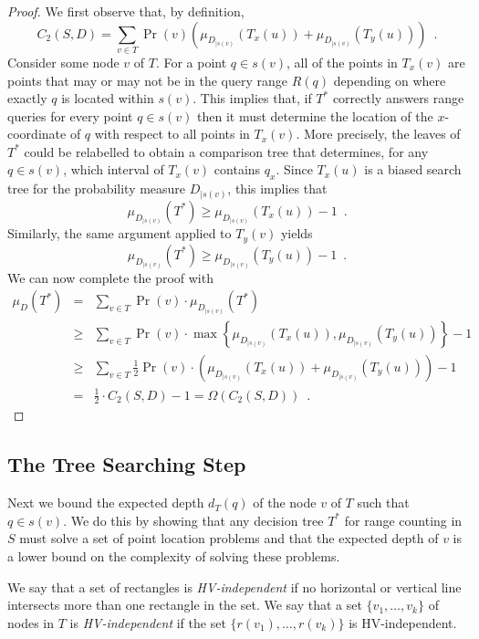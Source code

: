 \documentclass[charterfonts]{patmorin}
\begin{document}
\begin{proof}
We first observe that, by definition,
\[
  C_2(S,D) =  \sum_{v\in T} 
              \Pr(v)\left( \mu_{D_{\mid s(v)}}(T_x(u))
                               +  \mu_{D_{\mid s(v)}}(T_y(u)) \right)
           \enspace .
\]
Consider some node $v$ of $T$.  For a point $q\in s(v)$, all of the
points in $T_x(v)$ are points that may or may not be in the query
range $R(q)$ depending on where exactly $q$ is located within $s(v)$.
This implies that, if $T^*$ correctly answers range queries for every
point $q\in s(v)$ then it must determine the location of the
$x$-coordinate of $q$ with respect to all points in $T_x(v)$.  More
precisely, the leaves of $T^*$ could be relabelled to obtain a
comparison tree that determines, for any $q\in s(v)$, which interval
of $T_x(v)$ contains $q_x$.  Since $T_x(u)$ is a biased search tree
for the probability measure $D_{\mid s(v)}$, this implies that
\[
  \mu_{D_{\mid s(v)}}(T^*) \ge \mu_{D_{\mid s(v)}}(T_x(u)) - 1\enspace .
\]
Similarly, the same argument applied to $T_y(v)$ yields 
\[
  \mu_{D_{\mid s(v)}}(T^*) \ge \mu_{D_{\mid s(v)}}(T_y(u)) - 1\enspace .
\]
We can now complete the proof with
\begin{eqnarray*}
\mu_D(T^*) 
 & = & \sum_{v\in T} \Pr(v)\cdot\mu_{D_{\mid s(v)}}(T^*) \\
 & \ge & \sum_{v\in T}
	\Pr(v) \cdot\max\left\{\mu_{D_{\mid s(v)}}(T_x(u)), 
		       \mu_{D_{\mid s(v)}}(T_y(u))\right\} - 1 \\
 & \ge & \sum_{v\in T}
	\frac{1}{2}\Pr(v)\cdot\left( \mu_{D_{\mid s(v)}}(T_x(u))
                             +  \mu_{D_{\mid s(v)}}(T_y(u)) \right) - 1 \\
 & = & \frac{1}{2}\cdot C_2(S,D) - 1 = \Omega(C_2(S,D)) \enspace .
\end{eqnarray*}
\end{proof}

\subsection{The Tree Searching Step}

Next we bound the expected depth $d_T(q)$ of the node $v$ of $T$ such
that $q\in s(v)$.  We do this by showing that any decision tree $T^*$
for range counting in $S$ must solve a set of point location problems
and that the expected depth of $v$ is a lower bound on the complexity
of solving these problems.

We say that a set of rectangles is \emph{HV-independent} if no
horizontal or vertical line intersects more than one rectangle in the
set.  We say that a set $\{v_1,\ldots,v_k\}$ of nodes in $T$ is
\emph{HV-independent} if the set $\{r(v_1),\ldots,r(v_k)\}$ is
HV-independent.
\end{document}
